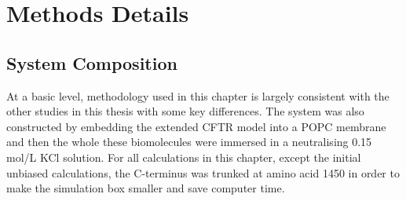 

\section{Methods Details}
\subsection{System Composition}
At a basic level, methodology used in this chapter is largely consistent with the other studies in this thesis with some key differences. The system was also constructed by embedding the extended CFTR model into a POPC membrane and then the whole these biomolecules were immersed in a neutralising 0.15 mol/L KCl solution. For all calculations in this chapter, except the initial unbiased calculations, the C-terminus was trunked at amino acid 1450 in order to make the simulation box smaller and save computer time.

